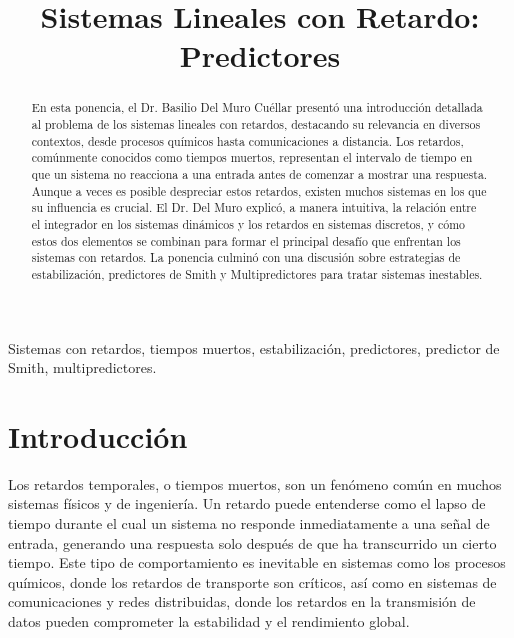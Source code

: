 \documentclass[conference]{IEEEtran}
\begin{document}
\title{Sistemas Lineales con Retardo: Predictores\\
}

\author{
	\and
}

\maketitle

\begin{abstract}
	En esta ponencia, el Dr. Basilio Del Muro Cuéllar presentó una introducción detallada al problema de los sistemas lineales con retardos, destacando su relevancia en diversos contextos, desde procesos químicos hasta comunicaciones a distancia. Los retardos, comúnmente conocidos como tiempos muertos, representan el intervalo de tiempo en que un sistema no reacciona a una entrada antes de comenzar a mostrar una respuesta. Aunque a veces es posible despreciar estos retardos, existen muchos sistemas en los que su influencia es crucial. El Dr. Del Muro explicó, a manera intuitiva, la relación entre el integrador en los sistemas dinámicos y los retardos en sistemas discretos, y cómo estos dos elementos se combinan para formar el principal desafío que enfrentan los sistemas con retardos. La ponencia culminó con una discusión sobre estrategias de estabilización, predictores de Smith y Multipredictores para tratar sistemas inestables.
\end{abstract}

\begin{IEEEkeywords}
	Sistemas con retardos, tiempos muertos, estabilización, predictores, predictor de Smith, multipredictores.
\end{IEEEkeywords}

\section{Introducción}

Los retardos temporales, o tiempos muertos, son un fenómeno común en muchos sistemas físicos y de ingeniería. Un retardo puede entenderse como el lapso de tiempo durante el cual un sistema no responde inmediatamente a una señal de entrada, generando una respuesta solo después de que ha transcurrido un cierto tiempo. Este tipo de comportamiento es inevitable en sistemas como los procesos químicos, donde los retardos de transporte son críticos, así como en sistemas de comunicaciones y redes distribuidas, donde los retardos en la transmisión de datos pueden comprometer la estabilidad y el rendimiento global.
\end{document}
